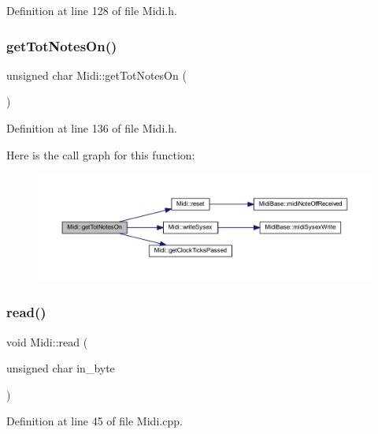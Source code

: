Definition at line 128 of file Midi.\+h.

\mbox{\label{class_midi_a138bcab57f6cf89474d774de29be9939}} 
\subsubsection{\texorpdfstring{get\+Tot\+Notes\+On()}{getTotNotesOn()}}
{\footnotesize\ttfamily unsigned char Midi\+::get\+Tot\+Notes\+On (\begin{DoxyParamCaption}{ }\end{DoxyParamCaption})\hspace{0.3cm}{\ttfamily [inline]}}



Definition at line 136 of file Midi.\+h.

Here is the call graph for this function\+:
\nopagebreak
\begin{figure}[H]
\begin{center}
\leavevmode
\includegraphics[width=350pt]{class_midi_a138bcab57f6cf89474d774de29be9939_cgraph}
\end{center}
\end{figure}
\mbox{\label{class_midi_a6003d2a28da28e44143e494faf16acd9}} 
\subsubsection{\texorpdfstring{read()}{read()}}
{\footnotesize\ttfamily void Midi\+::read (\begin{DoxyParamCaption}\item[{unsigned char}]{in\+\_\+byte }\end{DoxyParamCaption})}



Definition at line 45 of file Midi.\+cpp.

